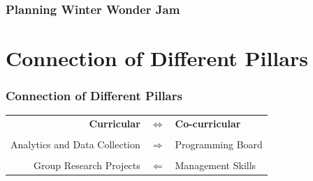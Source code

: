 \documentclass{beamer}
\begin{document}
\begin{frame}
\frametitle{Planning Winter Wonder Jam}
\begin{figure}[htp]
	\centering
	\quad
\end{figure}
\end{frame}


\section{Connection of Different Pillars}

\begin{frame}
\frametitle{Connection of Different Pillars}
\begin{table}
\begin{tabular}{rcl}
	\textbf{Curricular} & $\iff$ & \textbf{Co-curricular} \\
	&&\\
	Analytics and Data Collection & $\Longrightarrow$ & Programming Board \\
	&&\\
	Group Research Projects & $\Longleftarrow$ & Management Skills
\end{tabular}
\end{table}

\end{frame}
\end{document}
